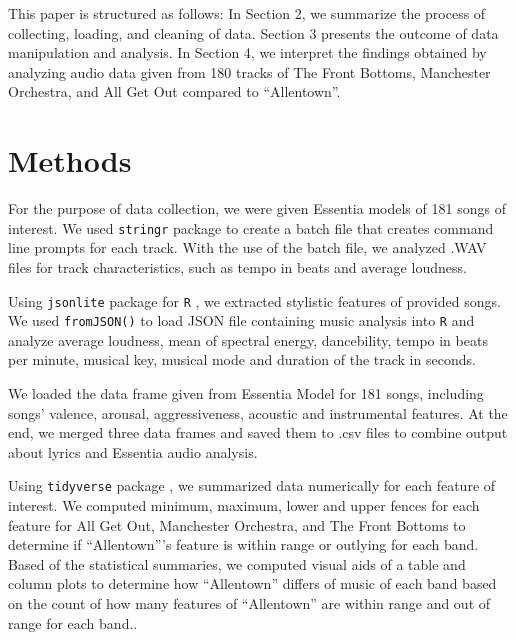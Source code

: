 \documentclass{article}\usepackage[]{graphicx}\usepackage[]{xcolor}
\begin{document}
\begin{multicols}{2}
This paper is structured as follows: In Section 2, we summarize the process of collecting, loading, and cleaning of data. Section 3 presents the outcome of data manipulation and analysis. In Section 4, we interpret the findings obtained by analyzing audio data given from 180 tracks of The Front Bottoms, Manchester Orchestra, and All Get Out compared to ``Allentown''.

\section{Methods}
For the purpose of data collection, we were given Essentia models of 181 songs of interest. We used \texttt{stringr} package \citep{stringr} to create a batch file that creates command line prompts for each track. With the use of the batch file, we analyzed .WAV files for track characteristics, such as tempo in beats and average loudness.

Using \texttt{jsonlite} package for \texttt{R} \citep{jsonlite}, we extracted stylistic features of provided songs. We used \texttt{fromJSON()} to load JSON file containing music analysis into \texttt{R} and analyze average loudness, mean of spectral energy, dancebility, tempo in beats per minute, musical key, musical mode and duration of the track in seconds. 

We loaded the data frame given from Essentia Model for 181 songs, including songs' valence, arousal, aggressiveness, acoustic and instrumental features. At the end, we merged three data frames and saved them to .csv files to combine output about lyrics and Essentia audio analysis. 

Using \texttt{tidyverse} package \citep{tidyverse}, we summarized data numerically for each feature of interest. We computed minimum, maximum, lower and upper fences for each feature for All Get Out, Manchester Orchestra, and The Front Bottoms to determine if ``Allentown'''s feature is within range or outlying for each band. Based of the statistical summaries, we computed visual aids of a table and column plots to determine how ``Allentown'' differs of music of each band based on the count of how many features of ``Allentown'' are within range and out of range for each band..



\end{multicols}
\end{document}
